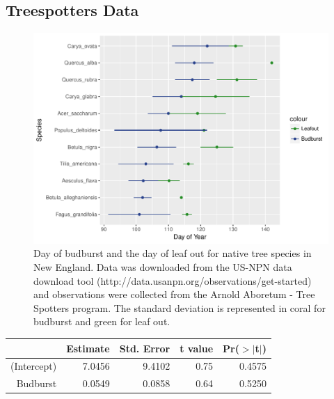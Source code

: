 \documentclass{article}\usepackage[]{graphicx}\usepackage[]{color}
\begin{document}
\subsection*{Treespotters Data}
\begin{figure} [H]
\begin{center}
\caption{Day of budburst and the day of leaf out for native tree species in New England. Data was downloaded from the US-NPN data download tool (http://data.usanpn.org/observations/get-started) and observations were collected from the Arnold Aboretum - Tree Spotters program. The standard deviation is represented in coral for budburst and green for leaf out. }
\includegraphics{..//figure/TS_2016.pdf} 
\end{center}
\end{figure}

\begin{table}[ht]
\centering
\begin{tabular}{rrrrr}
  \hline
 & Estimate & Std. Error & t value & Pr($>$$|$t$|$) \\ 
  \hline
(Intercept) & 7.0456 & 9.4102 & 0.75 & 0.4575 \\ 
  Budburst & 0.0549 & 0.0858 & 0.64 & 0.5250 \\ 
   \hline
\end{tabular}
\end{table}
\end{document}

